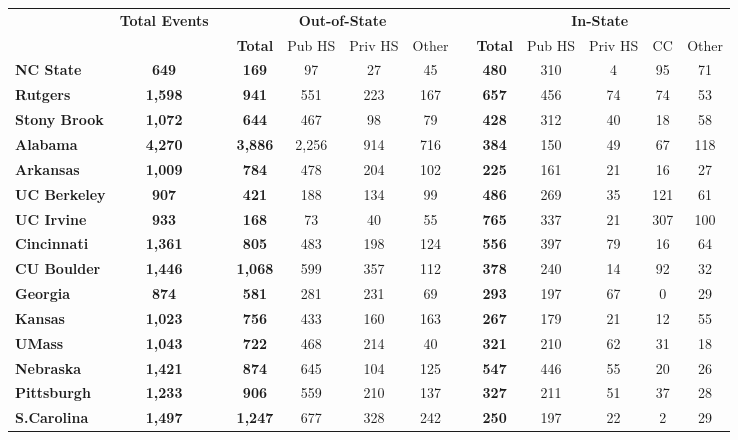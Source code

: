 \begin{tabular*}{\textwidth}{@{\extracolsep{\fill} } lcccccccccccc}%
&\bfseries Total Events&&\multicolumn{4}{c}{\bfseries Out-of-State}&&\multicolumn{5}{c}{\bfseries In-State}\\%
&&&\bfseries Total&Pub HS&Priv HS&Other&&\bfseries Total&Pub HS&Priv HS&CC&Other\\%
\hline%
\bfseries NC State&\bfseries 649&&\bfseries 169&97&27&45&&\bfseries 480&310&4&95&71\\%
\bfseries Rutgers&\bfseries 1,598&&\bfseries 941&551&223&167&&\bfseries 657&456&74&74&53\\%
\bfseries Stony Brook&\bfseries 1,072&&\bfseries 644&467&98&79&&\bfseries 428&312&40&18&58\\%
\bfseries Alabama&\bfseries 4,270&&\bfseries 3,886&2,256&914&716&&\bfseries 384&150&49&67&118\\%
\bfseries Arkansas&\bfseries 1,009&&\bfseries 784&478&204&102&&\bfseries 225&161&21&16&27\\%
\bfseries UC Berkeley&\bfseries 907&&\bfseries 421&188&134&99&&\bfseries 486&269&35&121&61\\%
\bfseries UC Irvine&\bfseries 933&&\bfseries 168&73&40&55&&\bfseries 765&337&21&307&100\\%
\bfseries Cincinnati&\bfseries 1,361&&\bfseries 805&483&198&124&&\bfseries 556&397&79&16&64\\%
\bfseries CU Boulder&\bfseries 1,446&&\bfseries 1,068&599&357&112&&\bfseries 378&240&14&92&32\\%
\bfseries Georgia&\bfseries 874&&\bfseries 581&281&231&69&&\bfseries 293&197&67&0&29\\%
\bfseries Kansas&\bfseries 1,023&&\bfseries 756&433&160&163&&\bfseries 267&179&21&12&55\\%
\bfseries UMass&\bfseries 1,043&&\bfseries 722&468&214&40&&\bfseries 321&210&62&31&18\\%
\bfseries Nebraska&\bfseries 1,421&&\bfseries 874&645&104&125&&\bfseries 547&446&55&20&26\\%
\bfseries Pittsburgh&\bfseries 1,233&&\bfseries 906&559&210&137&&\bfseries 327&211&51&37&28\\%
\bfseries S.Carolina&\bfseries 1,497&&\bfseries 1,247&677&328&242&&\bfseries 250&197&22&2&29\\%
\hline%
\end{tabular*}